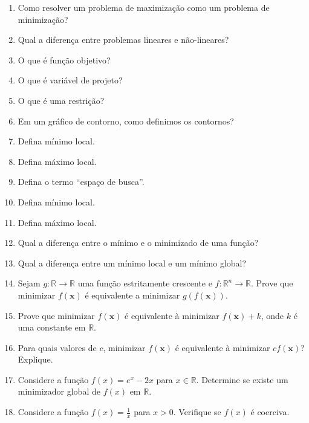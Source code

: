 \documentclass{article}
\newcommand{\x}{\mathbf{x}}
\begin{document}
\begin{enumerate}
    \item Como resolver um problema de maximização como um problema de minimização?
    \item Qual a diferença entre problemas lineares e não-lineares?
    \item O que é função objetivo?
    \item O que é variável de projeto?
    \item O que é uma restrição?
    \item Em um gráfico de contorno, como definimos os contornos?
    \item Defina mínimo local.
    \item Defina máximo local.
    \item Defina o termo ``espaço de busca''.
    \item Defina mínimo local.
    \item Defina máximo local.
    \item Qual a diferença entre o mínimo e o minimizado de uma função?
    \item Qual a diferença entre um mínimo local e um mínimo global?
    \item  Sejam $g : \mathbb{R} \rightarrow \mathbb{R}$ uma função estritamente crescente e $f : \mathbb{R}^n \rightarrow \mathbb{R}$. Prove que minimizar $f(\x)$ é equivalente a minimizar $g(f(\x))$.
    \item Prove que minimizar $f(\x)$ é equivalente à minimizar $f(\x) + k$, onde $k$ é uma constante em $\mathbb{R}$.
    \item Para quais valores de $c$, minimizar $f(\x)$ é equivalente à minimizar $cf(\x)$? Explique.
    \item Considere a função \(f(x) = e^x - 2x\) para \(x \in \mathbb{R}\). Determine se existe um minimizador global de \(f(x)\) em \(\mathbb{R}\).
    \item Considere a função \(f(x) = \frac{1}{x}\) para \(x > 0\). Verifique se \(f(x)\) é coerciva.
\end{enumerate}




%
%
\end{document}
